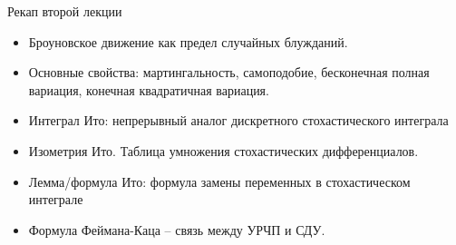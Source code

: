 \documentclass{beamer}
\begin{document}
\begin{frame}{Рекап второй лекции}
    \begin{itemize}
        \item Броуновское движение как предел случайных блужданий. 
        \item Основные свойства: мартингальность, самоподобие, бесконечная полная вариация, конечная квадратичная вариация.
        \item Интеграл Ито: непрерывный аналог дискретного стохастического интеграла
        \item Изометрия Ито. Таблица умножения стохастических дифференциалов.
        \item Лемма/формула Ито: формула замены переменных в стохастическом интеграле
        \item Формула Феймана-Каца -- связь между УРЧП и СДУ.
    \end{itemize}
\end{frame}
\end{document}
